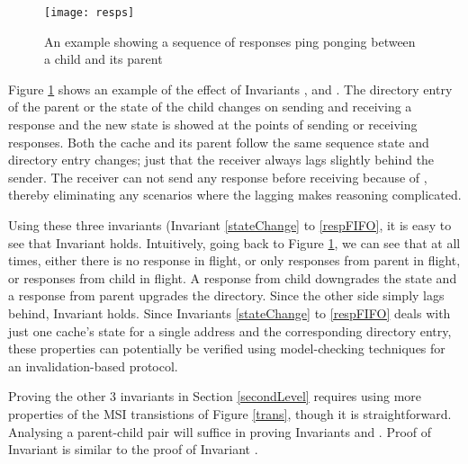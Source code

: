 \begin{figure}
\centering
\texttt{[image: resps]}
\caption{An example showing a sequence of responses ping ponging between a child and its parent}
\label{resps}
\end{figure}

Figure \ref{resps} shows an example of the effect of Invariants
,  and . The directory
entry of the parent or the state of the child changes on sending and receiving
a response and the new state is showed at the points of sending or receiving
responses.
Both the cache and its parent follow the same sequence state and directory
entry changes; just that the receiver always lags slightly behind the sender.
The receiver can not send any response before receiving because of
, thereby eliminating any scenarios where the lagging makes
reasoning complicated.

Using these three invariants (Invariant \ref{stateChange} to \ref{respFIFO}, it
is easy to see that Invariant  holds. Intuitively, going
back to Figure \ref{resps}, we can see that at all times, either there is no
response in flight, or only responses from parent in flight, or responses from
child in flight. A response from child downgrades the state and a response from
parent upgrades the directory. Since the other side simply lags behind,
Invariant  holds. Since Invariants \ref{stateChange} to
\ref{respFIFO} deals with just one cache's state for a single address and the
corresponding directory entry, these properties can potentially be verified
using model-checking techniques for an invalidation-based protocol.

Proving the other 3 invariants in Section \ref{secondLevel} requires using
more properties of the MSI transistions of Figure \ref{trans}, though it is
straightforward. Analysing a parent-child pair will suffice in proving Invariants
 and . Proof of Invariant
 is similar to the proof of Invariant
.

